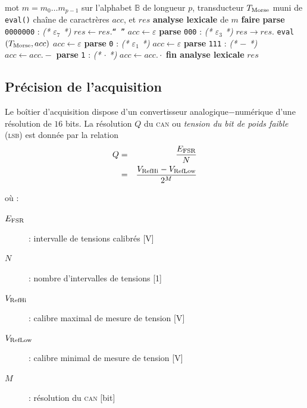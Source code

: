 \documentclass[twocolumn,pre,floats,aps,amsmath,amssymb]{revtex4}
\begin{document}
\begin{algorithm}[h]
\caption{D\'ecodage Morse \`a partir du signal modulant (num\'erique)}
\label{lexing_signal_morse}
\begin{algorithmic}[1]
  \REQUIRE mot $m = m_0 \dots m_{p  - 1}$ sur l'alphabet $\mathbb{B}$ de longueur $p$, transducteur $T_{\textup{Morse}}$ muni de \texttt{eval()}
  \STATE cha\^ine de caractr\`eres $acc$, et $res$ 
  \STATE \textbf{analyse lexicale} de $m$ \textbf{faire}
  \STATE \textbf{parse} \texttt{0000000} : \hfill \textit{(* $\varepsilon_7$ *)}
  \STATE $res \leftarrow res.$\texttt{`` ''}
  \STATE $acc \leftarrow \varepsilon$
  \STATE \textbf{parse} \texttt{000} : \hfill \textit{(* $\varepsilon_3$ *)}
  \STATE $res \rightarrow res .$ \texttt{eval}$(T_{\textup{Morse}}, acc)$
  \STATE $acc \leftarrow \varepsilon$
  \STATE \textbf{parse} \texttt{0} : \hfill \textit{(* $\varepsilon_1$ *)}
  \STATE $acc \leftarrow \varepsilon$
  \STATE \textbf{parse} \texttt{111} : \hfill \textit{(* $-$ *)}
  \STATE $acc \leftarrow acc . -$
  \STATE \textbf{parse} \texttt{1} : \hfill \textit{(* $\cdot$ *)}
  \STATE $acc \leftarrow acc . \cdot$
  \STATE \textbf{fin analyse lexicale}
  \RETURN $res$
\end{algorithmic}
\end{algorithm}

\subsection{Pr\'ecision de l'acquisition}
Le bo\^itier d'acquisition dispose d'un convertisseur analogique$-$num\'erique d'une r\'esolution de $16$ bits. La r\'esolution $Q$ du \textsc{can} ou \textit{tension du bit de poids faible} (\textsc{lsb}) est donn\'ee par la relation
\begin{eqnarray*}
  Q &=& \frac{E_{\textup{FSR}}}{N}\\
    &=& \frac{V_{\textup{RefHi}} - V_{\textup{RefLow}}}{2^M}
\end{eqnarray*}

o\`u :

\begin{description}
  \item[$E_{\textup{FSR}}$]{ : intervalle de tensions calibr\'es [V]}
  \item[$N$]{ : nombre d'intervalles de tensions [1]}
  \item[$V_{\textup{RefHi}}$]{ : calibre maximal de mesure de tension [V]}
  \item[$V_{\textup{RefLow}}$]{ : calibre minimal de mesure de tension [V]}
  \item[$M$]{ : r\'esolution du \textsc{can} [bit]}
\end{description}
\end{document}
